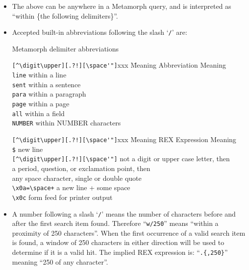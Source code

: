 \begin{itemize}

\item The above can be anywhere in a Metamorph query, and is
interpreted as ``within \{the following delimiters\}''.

\item Accepted built-in abbreviations following the slash `\verb`/`'
are:

\begin{table}[h]
\caption{Metamorph delimiter abbreviations}{\label{tab:within}}
\begin{tabbing}
\verb`[^\digit\upper][.?!][\space'"]`xxx \= Meaning \kill
Abbreviation \> Meaning \\
\verb`line`  \> within a line \\
\verb`sent`  \> within a sentence \\
\verb`para`  \> within a paragraph \\
\verb`page`  \> within a page  \\
\verb`all`   \> within a field \\
\verb`NUMBER`\> within NUMBER characters \\
\end{tabbing}

\begin{tabbing}
\verb`[^\digit\upper][.?!][\space'"]`xxx \= Meaning \kill
REX Expression                           \> Meaning   \\
\verb`$`                                  new line      \\
\verb`[^\digit\upper][.?!][\space'"]`    \> not a digit or upper case letter, then \\
                                         \> a period, question, or exclamation point, then \\
                                         \> any space character, single or double quote  \\
\verb`\x0a=\space+`                      \> a new line + some space  \\
\verb`\x0c`                              \> form feed for printer output \\
\end{tabbing}
\end{table}

\item A number following a slash `\verb`/`' means the number of
characters before and after the first search item found.  Therefore
``\verb`w/250`'' means ``within a proximity of 250 characters''.  When
the first occurrence of a valid search item is found, a window of 250
characters in either direction will be used to determine if it is a
valid hit.  The implied REX expression is:  ``\verb`.{,250}`''
meaning ``250 of any character''.


\end{itemize}
